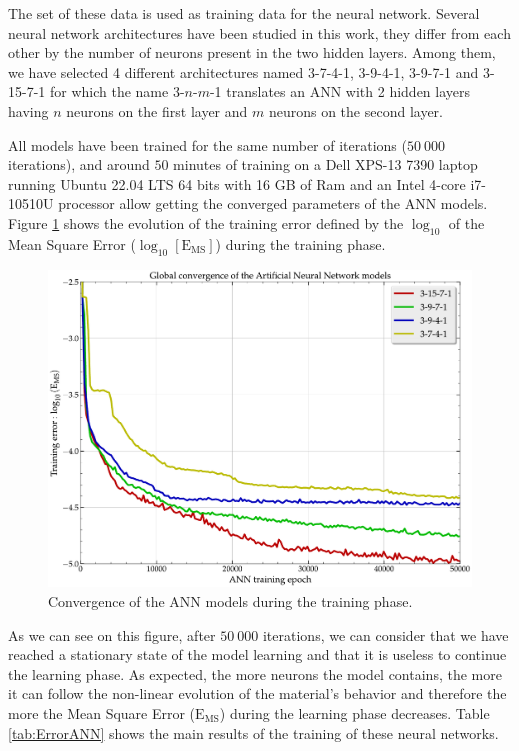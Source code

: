 \documentclass[algorithms,article,submit,pdftex,moreauthors]{Definitions/mdpi}
\DeclareRobustCommand{\MSE}{\text{E}_\text{MS}}
\begin{document}
The set of these data is used as training data for the neural network.
Several neural network architectures have been studied in this work, they differ from each other by the number of neurons present in the two hidden layers.
Among them, we have selected 4 different architectures named 3-7-4-1, 3-9-4-1, 3-9-7-1 and 3-15-7-1 for which the name 3-$n$-$m$-1 translates an ANN with 2 hidden layers having $n$ neurons on the first layer and $m$ neurons on the second layer.

All models have been trained for the same number of iterations ($50~000$ iterations), and around $50$ minutes of training on a Dell XPS-13 7390 laptop running Ubuntu 22.04 LTS 64 bits with 16 GB of Ram and an Intel 4-core i7-10510U processor allow getting the converged parameters of the ANN models.
Figure \ref{fig:Convergence-ANN} shows the evolution of the training error defined by the $\log_{10}$ of the Mean Square Error ($\log_{10}\left[\MSE\right]$) during the training phase.
\begin{figure}[!ht]
\centering
\includegraphics[width=0.9\columnwidth]{Figures/Convergence-ANN}
\caption{Convergence of the ANN models during the training phase.}
\label{fig:Convergence-ANN}
\end{figure}
As we can see on this figure, after $50~000$ iterations, we can consider that we have reached a stationary state of the model learning and that it is useless to continue the learning phase.
As expected, the more neurons the model contains, the more it can follow the non-linear evolution of the material’s behavior and therefore the more the Mean Square Error ($\MSE$) during the learning phase decreases.
Table \ref{tab:ErrorANN} shows the main results of the training of these neural networks.
\end{document}
